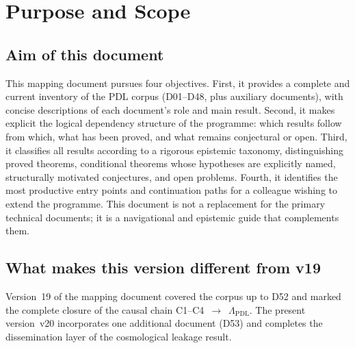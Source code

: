 \documentclass[11pt,a4paper]{article}
\theoremstyle{plain}
\theoremstyle{definition}
\theoremstyle{remark}
\begin{document}
\begin{abstract}
\begin{itemize}
\item D45 derives the first falsifiable astrophysical confrontation: the primordial black hole survival threshold is shifted upward by $+11.89\%$ relative to the standard GR value, giving $M^*_{\mathrm{PDL}} = \sigma(40)^{-2/3}\,M^*_{\mathrm{GR}} \approx 5.706 \times 10^{14}$\,g, testable with existing Fermi-LAT data via \textsc{BlackHawk} and \textsc{Isatis}.
\end{itemize}
There is no longer any foundational open problem at the axiomatic level. The causal chain from C1--C4 to the cosmological constant $\Lambda_{\mathrm{PDL}}$ is complete. The remaining open problems (OP2--OP17 and those inherited from D48) concern higher-level derivations, extensions, and experimental confrontations.
\end{abstract}

\clearpage

\tableofcontents

\clearpage

\section{Purpose and Scope}
\label{sec:purpose}

\subsection{Aim of this document}
\label{subsec:aim}
This mapping document pursues four objectives. First, it provides a complete and current inventory of the PDL corpus (D01--D48, plus auxiliary documents), with concise descriptions of each document's role and main result. Second, it makes explicit the logical dependency structure of the programme: which results follow from which, what has been proved, and what remains conjectural or open. Third, it classifies all results according to a rigorous epistemic taxonomy, distinguishing proved theorems, conditional theorems whose hypotheses are explicitly named, structurally motivated conjectures, and open problems. Fourth, it identifies the most productive entry points and continuation paths for a colleague wishing to extend the programme. This document is not a replacement for the primary technical documents; it is a navigational and epistemic guide that complements them.

\subsection{What makes this version different from v19}
\label{subsec:diffv19}
Version~19 of the mapping document covered the corpus up to D52 and marked the complete closure of the causal chain C1--C4~$\to$~$\Lambda_{\mathrm{PDL}}$. The present version~v20 incorporates one additional document (D53) and completes the dissemination layer of the cosmological leakage result.
\end{document}
